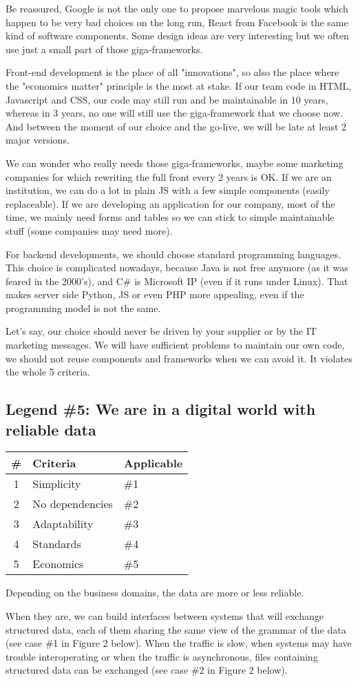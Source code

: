 \documentclass[]{article}
\newcommand{\criterias}[5]
{\begin{tabular}{|c|l|l|}
\textbf{\#} & \textbf{Criteria} & \textbf{Applicable} \\
\hline
1 & Simplicity      & \#1 \\
2 & No dependencies & \#2 \\
3 & Adaptability    & \#3 \\
4 & Standards       & \#4 \\
5 & Economics       & \#5 \\
\end{tabular}}
\begin{document}
Be reassured, Google is not the only one to propose marvelous magic tools which happen to be very bad choices on the long run, React from Facebook is the same kind of software components. Some design ideas are very interesting but we often use just a small part of those giga-frameworks.

Front-end development is the place of all "innovations", so also the place where the "economics matter" principle is the most at stake. If our team code in HTML, Javascript and CSS, our code may still run and be maintainable in 10 years, whereas in 3 years, no one will still use the giga-framework that we choose now. And between the moment of our choice and the go-live, we will be late at least 2 major versions.

We can wonder who really needs those giga-frameworks, maybe some marketing companies for which rewriting the full front every 2 years is OK. If we are an institution, we can do a lot in plain JS with a few simple components (easily replaceable). If we are developing an application for our company, most of the time, we mainly need forms and tables so we can stick to simple maintainable stuff (some companies may need more).

For backend developments, we should choose standard programming languages. This choice is complicated nowadays, because Java is not free anymore (as it was feared in the 2000's), and C\# is Microsoft IP (even if it runs under Linux). That makes server side Python, JS or even PHP more appealing, even if the programming model is not the same.

Let's say, our choice should never be driven by your supplier or by the IT marketing messages. We will have sufficient problems to maintain our own code, we should not reuse components and frameworks when we can avoid it. It violates the whole 5 criteria.

\subsection{Legend \#5: We are in a digital world with reliable data}

\criterias{-}{-}{Yes}{-}{Yes}

Depending on the business domains, the data are more or less reliable.

When they are, we can build interfaces between systems that will exchange structured data, each of them sharing the same view of the grammar of the data (see case \#1 in Figure 2 below). When the traffic is slow, when systems may have trouble interoperating or when the traffic is asynchronous, files containing structured data can be exchanged (see case \#2 in Figure 2 below).
\end{document}
